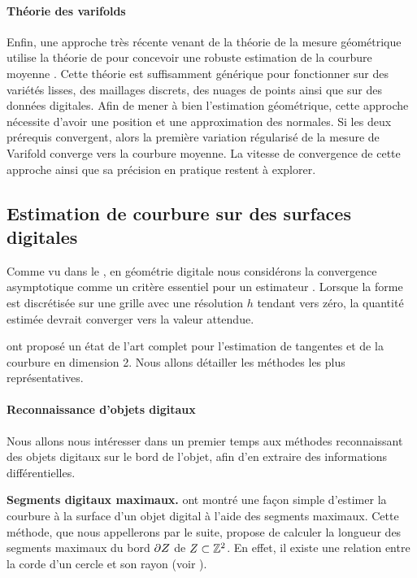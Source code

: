 \paragraph{Théorie des varifolds}
%
Enfin, une approche très récente venant de la théorie de la mesure géométrique
utilise la théorie de  \cite{Almgren1965} pour concevoir une
robuste estimation de la courbure moyenne \cite{Buet2014,Buet2015}. Cette
théorie est suffisamment générique pour fonctionner sur des variétés lisses, des
maillages discrets, des nuages de points ainsi que sur des données digitales.
Afin de mener à bien l'estimation géométrique, cette approche nécessite d'avoir
une position et une approximation des normales. Si les deux prérequis
convergent, alors la première variation régularisé de la mesure de Varifold
converge vers la courbure moyenne. La vitesse de convergence de cette approche
ainsi que sa précision en pratique restent à explorer.
%
\subsection{Estimation de courbure sur des surfaces digitales}
%
Comme vu dans le , en géométrie digitale nous
considérons la convergence asymptotique comme un critère essentiel pour un
estimateur \cite{Klette2000}. Lorsque la forme est discrétisée
sur une grille avec une résolution $h$ tendant vers zéro, la quantité estimée
devrait converger vers la valeur attendue.


 ont proposé un état de l'art
complet pour l'estimation de tangentes et de la courbure en dimension 2. Nous
allons détailler les méthodes les plus représentatives.
%
\paragraph{Reconnaissance d'objets digitaux}
%
Nous allons nous intéresser dans un premier temps aux méthodes reconnaissant des
objets digitaux sur le bord de l'objet, afin d'en extraire des informations
différentielles.


\noindent\textbf{Segments digitaux maximaux.\quad}
 ont montré une façon simple d'estimer
la courbure à la surface d'un objet digital à l'aide des segments maximaux.
Cette méthode, que nous appellerons \MDSS par le suite, propose de calculer la
longueur des segments maximaux du bord $\partial Z$ de $Z
\subset \mathbb{Z}^2$. En effet, il existe une relation entre la corde d'un cercle et
son rayon (voir ).

